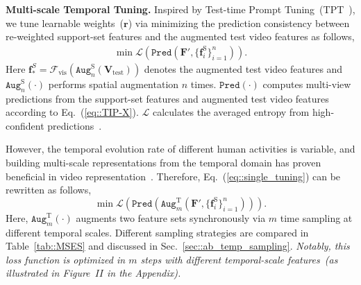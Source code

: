 {\noindent\textbf{Multi-scale Temporal Tuning.} 
Inspired by Test-time Prompt Tuning~(TPT~\cite{shu2022tpt}), we tune learnable weights~($\bm r$) via minimizing the prediction consistency between re-weighted support-set features and the augmented test video features as follows, 
\begin{equation}
\begin{gathered}
\min\mathcal{L}(\texttt{Pred}(\bm{F}', \{\bm{f}^\mathrm{S}_{i}\}^{n}_{i=1})).
\label{eq::single_tuning}
\end{gathered}
\end{equation}
Here $\bm{f}^{S}_{*}=\mathcal{F}_\mathrm{vis}(\texttt{Aug}^\mathrm{S}_{n}(\bm{V}_\mathrm{test}))$ denotes the augmented test video features and $\texttt{Aug}^{\mathrm{S}}_{n}(\cdot)$ performs spatial augmentation $n$ times. $\texttt{Pred}(\cdot)$ computes multi-view predictions from the support-set features and augmented test video features according to Eq.~(\ref{eq::TIP-X}). $\mathcal{L}$ calculates the averaged entropy from high-confident predictions~\cite{shu2022tpt}.


However, the temporal evolution rate of different human activities is variable, and building multi-scale representations from the temporal domain has proven beneficial in {video representation~\cite{feichtenhofer2019slowfast,yan_2024_DTSTPT}}. Therefore, Eq.~(\ref{eq::single_tuning}) can be rewritten as follows,
\begin{equation}
\min\mathcal{L}(\texttt{Pred}(\texttt{Aug}^\mathrm{T}_{m}(\bm{F}', \{\bm{f}^\mathrm{S}_{i}\}^{n}_{i=1}))).
\end{equation}Here, $\texttt{Aug}^\mathrm{T}_{m}(\cdot)$ augments two feature sets synchronously via $m$ time sampling at different temporal scales. Different sampling strategies are compared in Table~\ref{tab::MSES} and discussed in Sec.~\ref{sec::ab_temp_sampling}. \textit{Notably, this loss function is optimized in $m$ steps with different temporal-scale features~({as illustrated in Figure~$II$ in the Appendix)}.}
}